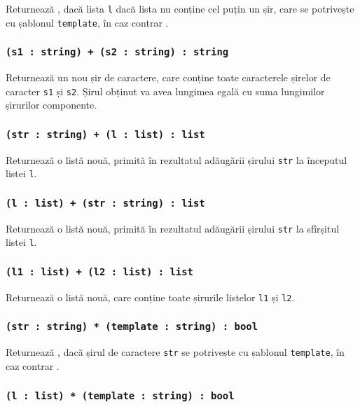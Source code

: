 Returnează \true{}, dacă lista \texttt{l} dacă lista nu conține cel puțin un șir, care se potrivește cu șablonul \texttt{template}, în caz contrar \false{}.

\subsubsection{\texttt{(s1 : string) + (s2 : string) : string}}

Returnează un nou șir de caractere, care conține toate caracterele șirelor de caracter \texttt{s1} și \texttt{s2}. Șirul obținut va avea lungimea egală cu suma lungimilor șirurilor componente.

\subsubsection{\texttt{(str : string) + (l : list) : list}}

Returnează o listă nouă, primită în rezultatul adăugării șirului \texttt{str} la începutul listei \texttt{l}.

\subsubsection{\texttt{(l : list) + (str : string) : list}}

Returnează o listă nouă, primită în rezultatul adăugării șirului \texttt{str} la sfîrșitul listei \texttt{l}.

\subsubsection{\texttt{(l1 : list) + (l2 : list) : list}}

Returnează o listă nouă, care conține toate șirurile listelor \texttt{l1} și \texttt{l2}.

\subsubsection{\texttt{(str : string) * (template : string) : bool}}

Returnează \true{}, dacă șirul de caractere \texttt{str} se potrivește cu șablonul \texttt{template}, în caz contrar \false{}.

\subsubsection{\texttt{(l : list) * (template : string) : bool}}

